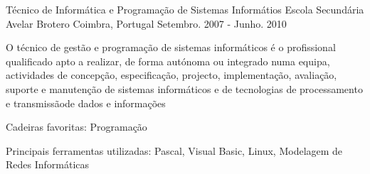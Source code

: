 \begin{cventries}
\cventry
{Técnico de Informática e Programação de Sistemas Informátios} %
{Escola Secundária Avelar Brotero} %
{Coimbra, Portugal} %
{Setembro. 2007 - Junho. 2010} %
{  %
\begin{cvitems}
\item {O técnico de gestão e programação de sistemas informáticos é o profissional qualificado apto a realizar, de forma autónoma ou integrado numa equipa, actividades de concepção, especificação, projecto, implementação, avaliação, suporte e manutenção de sistemas informáticos e de tecnologias de processamento e transmissãode dados e informações }
\item{Cadeiras favoritas: Programação}
\item{Principais ferramentas utilizadas: Pascal, Visual Basic, Linux, Modelagem de Redes Informáticas}
\
\end{cvitems}
}



\end{cventries}